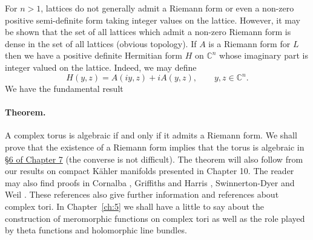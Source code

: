 For $n>1$, lattices do not generally admit a Riemann form or even a non-zero positive semi-definite form taking integer values on the lattice. However, it may be shown that the set of all lattices which admit a non-zero Riemann form is dense in the set of all lattices (obvious topology). If $A$ is a Riemann form for $L$ then we have a positive definite Hermitian form $H$ on $\mathbb C^n$ whose imaginary part is integer valued on the lattice. Indeed, we may define
\[
H(y,z)=A(iy,z)+iA(y,z),\qquad y,z\in\mathbb C^n.
\]
We have the fundamental result

\paragraph*{Theorem.} A complex torus is algebraic if and only if it admits a Riemann form.
We shall prove that the existence of a Riemann form implies that the torus is algebraic in \hyperref[sec:7:6]{\S6 of Chapter 7} (the converse is not difficult). The theorem will also follow from our results on compact K\"ahler manifolds presented in Chapter 10. The reader may also find proofs in Cornalba \cite{bib:I:cornalba-m:1}, Griffiths and Harris \cite{bib:I:griffiths-p-and-harris-j:1}, Swinnerton-Dyer \cite{bib:I:swinnerton-dyer-h-p-f:1} and Weil \cite{bib:I:weil-a:1}. These references also give further information and references about complex tori. In Chapter~\ref{ch:5} we shall have a little to say about the construction of meromorphic functions on complex tori as well as the role played by theta functions and holomorphic line bundles.

